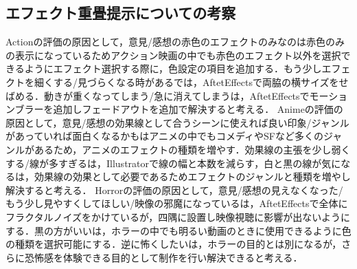 \subsection{エフェクト重畳提示についての考察}
Actionの評価の原因として，意見/感想の赤色のエフェクトのみなのは赤色のみの表示になっているためアクション映画の中でも赤色のエフェクト以外を選択できるようにエフェクト選択する際に，色設定の項目を追加する．もう少しエフェクトを細くする/見づらくなる時があるでは，AftetEffectsで両脇の横サイズをせばめる．動きが重くなってしまう/急に消えてしまうは，AftetEffectsでモーションブラーを追加しフェードアウトを追加で解決すると考える．
Animeの評価の原因として，意見/感想の効果線として合うシーンに使えれば良い印象/ジャンルがあっていれば面白くなるかもはアニメの中でもコメディやSFなど多くのジャンルがあるため，アニメのエフェクトの種類を増やす．効果線の主張を少し弱くする/線が多すぎるは，Illustratorで線の幅と本数を減らす，白と黒の線が気になるは，効果線の効果として必要であるためエフェクトのジャンルと種類を増やし解決すると考える．
Horrorの評価の原因として，意見/感想の見えなくなった/もう少し見やすくしてほしい/映像の邪魔になっているは，AftetEffectsで全体にフラクタルノイズをかけているが，四隅に設置し映像視聴に影響が出ないようにする．黒の方がいいは，ホラーの中でも明るい動画のときに使用できるように色の種類を選択可能にする．逆に怖くしたいは，ホラーの目的とは別になるが，さらに恐怖感を体験できる目的として制作を行い解決できると考える．